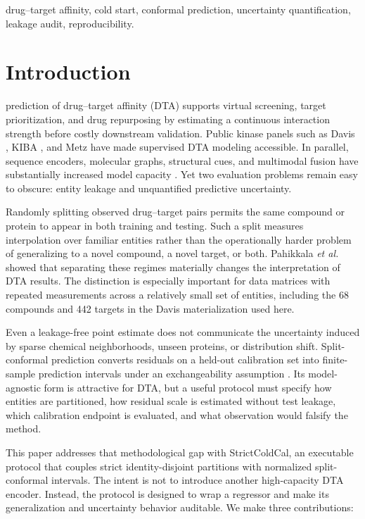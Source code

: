\documentclass[lettersize,journal]{IEEEtran}
\begin{document}
\begin{IEEEkeywords}
drug--target affinity, cold start, conformal prediction, uncertainty quantification, leakage audit, reproducibility.
\end{IEEEkeywords}

\section{Introduction}
 prediction of drug--target affinity (DTA) supports virtual screening, target prioritization, and drug repurposing by estimating a continuous interaction strength before costly downstream validation. Public kinase panels such as Davis \cite{davis2011}, KIBA \cite{tang2014kiba}, and Metz \cite{metz2011} have made supervised DTA modeling accessible. In parallel, sequence encoders, molecular graphs, structural cues, and multimodal fusion have substantially increased model capacity \cite{deepdta,graphdta,datadta,wang2024review}. Yet two evaluation problems remain easy to obscure: entity leakage and unquantified predictive uncertainty.

Randomly splitting observed drug--target pairs permits the same compound or protein to appear in both training and testing. Such a split measures interpolation over familiar entities rather than the operationally harder problem of generalizing to a novel compound, a novel target, or both. Pahikkala \emph{et al.} \cite{pahikkala2015} showed that separating these regimes materially changes the interpretation of DTA results. The distinction is especially important for data matrices with repeated measurements across a relatively small set of entities, including the 68 compounds and 442 targets in the Davis materialization used here.

Even a leakage-free point estimate does not communicate the uncertainty induced by sparse chemical neighborhoods, unseen proteins, or distribution shift. Split-conformal prediction converts residuals on a held-out calibration set into finite-sample prediction intervals under an exchangeability assumption \cite{vovk2005,angelopoulos2023}. Its model-agnostic form is attractive for DTA, but a useful protocol must specify how entities are partitioned, how residual scale is estimated without test leakage, which calibration endpoint is evaluated, and what observation would falsify the method.

This paper addresses that methodological gap with StrictColdCal, an executable protocol that couples strict identity-disjoint partitions with normalized split-conformal intervals. The intent is not to introduce another high-capacity DTA encoder. Instead, the protocol is designed to wrap a regressor and make its generalization and uncertainty behavior auditable. We make three contributions:
\end{document}
